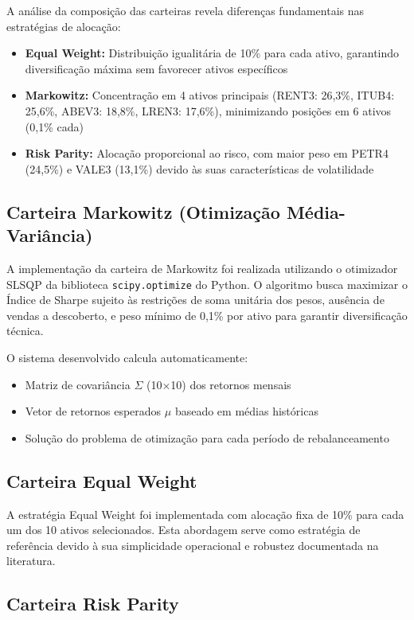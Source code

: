A análise da composição das carteiras revela diferenças fundamentais nas estratégias de alocação:

\begin{itemize}
    \item \textbf{Equal Weight:} Distribuição igualitária de 10\% para cada ativo, garantindo diversificação máxima sem favorecer ativos específicos
    \item \textbf{Markowitz:} Concentração em 4 ativos principais (RENT3: 26,3\%, ITUB4: 25,6\%, ABEV3: 18,8\%, LREN3: 17,6\%), minimizando posições em 6 ativos (0,1\% cada)
    \item \textbf{Risk Parity:} Alocação proporcional ao risco, com maior peso em PETR4 (24,5\%) e VALE3 (13,1\%) devido às suas características de volatilidade
\end{itemize}

\subsection{Carteira Markowitz (Otimização Média-Variância)}

A implementação da carteira de Markowitz foi realizada utilizando o otimizador SLSQP da biblioteca \texttt{scipy.optimize} do Python. O algoritmo busca maximizar o Índice de Sharpe sujeito às restrições de soma unitária dos pesos, ausência de vendas a descoberto, e peso mínimo de 0,1\% por ativo para garantir diversificação técnica.

O sistema desenvolvido calcula automaticamente:
\begin{itemize}
    \item Matriz de covariância $\Sigma$ (10×10) dos retornos mensais
    \item Vetor de retornos esperados $\mu$ baseado em médias históricas
    \item Solução do problema de otimização para cada período de rebalanceamento
\end{itemize}

\subsection{Carteira Equal Weight}

A estratégia Equal Weight foi implementada com alocação fixa de 10\% para cada um dos 10 ativos selecionados. Esta abordagem serve como estratégia de referência devido à sua simplicidade operacional e robustez documentada na literatura.

\subsection{Carteira Risk Parity}

